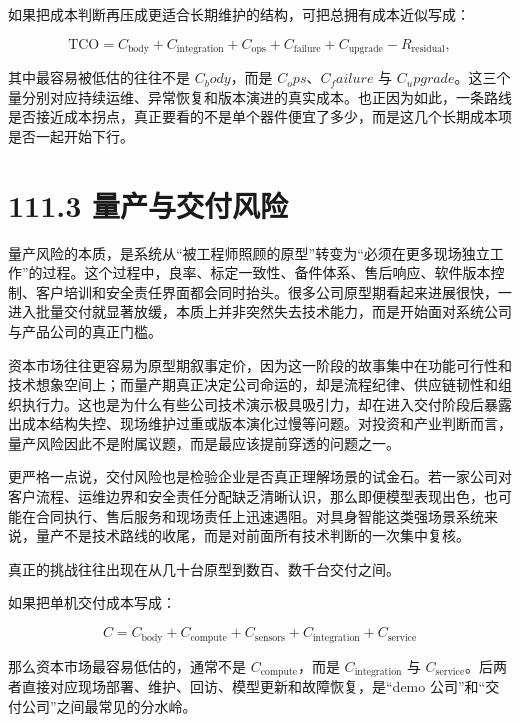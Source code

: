 如果把成本判断再压成更适合长期维护的结构，可把总拥有成本近似写成：

\begingroup
\scriptsize
\begin{equation*}
\text{TCO} = C_{\text{body}} + C_{\text{integration}} + C_{\text{ops}} + C_{\text{failure}} + C_{\text{upgrade}} - R_{\text{residual}},
\end{equation*}
\endgroup

其中最容易被低估的往往不是 \(C_body\)，而是 \(C_ops\)、\(C_failure\) 与 \(C_upgrade\)。这三个量分别对应持续运维、异常恢复和版本演进的真实成本。也正因为如此，一条路线是否接近成本拐点，真正要看的不是单个器件便宜了多少，而是这几个长期成本项是否一起开始下行。

\section*{111.3 量产与交付风险}


量产风险的本质，是系统从“被工程师照顾的原型”转变为“必须在更多现场独立工作”的过程。这个过程中，良率、标定一致性、备件体系、售后响应、软件版本控制、客户培训和安全责任界面都会同时抬头。很多公司原型期看起来进展很快，一进入批量交付就显著放缓，本质上并非突然失去技术能力，而是开始面对系统公司与产品公司的真正门槛。

资本市场往往更容易为原型期叙事定价，因为这一阶段的故事集中在功能可行性和技术想象空间上；而量产期真正决定公司命运的，却是流程纪律、供应链韧性和组织执行力。这也是为什么有些公司技术演示极具吸引力，却在进入交付阶段后暴露出成本结构失控、现场维护过重或版本演化过慢等问题。对投资和产业判断而言，量产风险因此不是附属议题，而是最应该提前穿透的问题之一。

更严格一点说，交付风险也是检验企业是否真正理解场景的试金石。若一家公司对客户流程、运维边界和安全责任分配缺乏清晰认识，那么即便模型表现出色，也可能在合同执行、售后服务和现场责任上迅速遇阻。对具身智能这类强场景系统来说，量产不是技术路线的收尾，而是对前面所有技术判断的一次集中复核。

真正的挑战往往出现在从几十台原型到数百、数千台交付之间。

如果把单机交付成本写成：

\begingroup
\scriptsize
\begin{equation*}
C = C_{\text{body}} + C_{\text{compute}} + C_{\text{sensors}} + C_{\text{integration}} + C_{\text{service}}
\end{equation*}
\endgroup

那么资本市场最容易低估的，通常不是 \(C_{\text{compute}}\)，而是 \(C_{\text{integration}}\) 与 \(C_{\text{service}}\)。后两者直接对应现场部署、维护、回访、模型更新和故障恢复，是“demo 公司”和“交付公司”之间最常见的分水岭。

